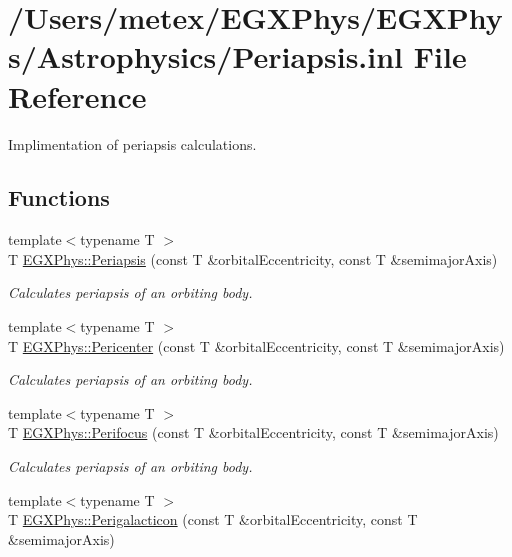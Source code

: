 \hypertarget{_periapsis_8inl}{}\section{/\+Users/metex/\+E\+G\+X\+Phys/\+E\+G\+X\+Phys/\+Astrophysics/\+Periapsis.inl File Reference}
\label{_periapsis_8inl}


Implimentation of periapsis calculations.  


\subsection*{Functions}
\begin{DoxyCompactItemize}
\item 
{\footnotesize template$<$typename T $>$ }\\T \hyperlink{group___astrophysics_ga4414ac75539371ec874a3d25cad6c9fe}{E\+G\+X\+Phys\+::\+Periapsis} (const T \&orbital\+Eccentricity, const T \&semimajor\+Axis)
\begin{DoxyCompactList}\small\item\em Calculates periapsis of an orbiting body. \end{DoxyCompactList}\item 
{\footnotesize template$<$typename T $>$ }\\T \hyperlink{group___astrophysics_gac4c419a87a5802cf6afc98f50792e99f}{E\+G\+X\+Phys\+::\+Pericenter} (const T \&orbital\+Eccentricity, const T \&semimajor\+Axis)
\begin{DoxyCompactList}\small\item\em Calculates periapsis of an orbiting body. \end{DoxyCompactList}\item 
{\footnotesize template$<$typename T $>$ }\\T \hyperlink{group___astrophysics_gaff62669fb364a245cb85f9a91d8ea71f}{E\+G\+X\+Phys\+::\+Perifocus} (const T \&orbital\+Eccentricity, const T \&semimajor\+Axis)
\begin{DoxyCompactList}\small\item\em Calculates periapsis of an orbiting body. \end{DoxyCompactList}\item 
{\footnotesize template$<$typename T $>$ }\\T \hyperlink{group___astrophysics_ga074fecab96b90bebffa512a37e52d90b}{E\+G\+X\+Phys\+::\+Perigalacticon} (const T \&orbital\+Eccentricity, const T \&semimajor\+Axis)

\end{DoxyCompactItemize}
